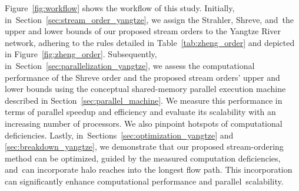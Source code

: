 \documentclass[water,article,accept,pdftex,moreauthors]{Definitions/mdpi}
\begin{document}
Figure~\ref{fig:workflow} shows the workflow of this study. Initially, in~Section~\ref{sec:stream_order_yangtze}, we assign the Strahler, Shreve, and~the upper and lower bounds of our proposed stream orders to the Yangtze River network, adhering to the rules detailed in Table~\ref{tab:zheng_order} and depicted in Figure~\ref{fig:zheng_order}. Subsequently, in~Section~\ref{sec:parallelization_yangtze}, we assess the computational performance of the Shreve order and the proposed stream orders' upper and lower bounds using the conceptual shared-memory parallel execution machine described in Section~\ref{sec:parallel_machine}. We measure this performance in terms of parallel speedup and efficiency and evaluate its scalability with an increasing number of processors. We also pinpoint hotspots of computational deficiencies. Lastly, in~Sections~\ref{sec:optimization_yangtze} and \ref{sec:breakdown_yangtze}, we demonstrate that our proposed stream-ordering method can be optimized, guided by the measured computation deficiencies, and~can incorporate halo reaches into the longest flow path. This incorporation can significantly enhance computational performance and parallel~scalability.
\end{document}

